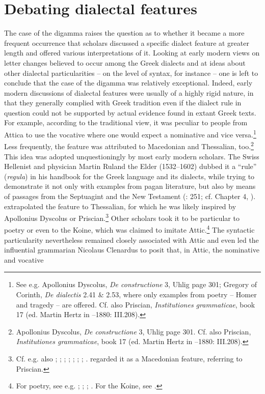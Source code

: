 \section{Debating dialectal features}\label{sec:6.4}

The case of the digamma raises the question as to whether it became a more frequent occurrence that scholars discussed a specific dialect feature at greater length and offered various interpretations of it. Looking at early modern views on letter changes believed to occur among the Greek dialects and at ideas about other dialectal particularities – on the level of syntax, for instance – one is left to conclude that the case of the digamma was relatively exceptional. Indeed, early modern discussions of dialectal features were usually of a highly rigid nature, in that they generally complied with Greek tradition even if the dialect rule in question could not be supported by actual evidence found in extant Greek texts. For example, according to the traditional view, it was peculiar to people from Attica to use the vocative where one would expect a nominative and vice versa.\footnote{See e.g. Apollonius Dyscolus, \textit{De constructione} 3, Uhlig page 301; Gregory of Corinth, \textit{De dialectis} 2.41 \& 2.53, where only examples from poetry – Homer and tragedy – are offered. Cf. also Priscian, \textit{Institutiones grammaticae}, book 17 (ed. Martin Hertz in \citealt{Keil1855}–1880: III.208).} Less frequently, the feature was attributed to Macedonian and Thessalian, too.\footnote{Apollonius Dyscolus, \textit{De constructione} 3, Uhlig page 301. Cf. also Priscian, \textit{Institutiones grammaticae}, book 17 (ed. Martin Hertz in \citealt{Keil1855}–1880: III.208).} This idea was adopted unquestioningly by most early modern scholars. The Swiss Hellenist and physician Martin Ruland the Elder (1532–1602) dubbed it a “rule” (\textit{regula}) in his handbook for the Greek language and its dialects, while trying to demonstrate it not only with examples from pagan literature, but also by means of passages from the Septuagint and the New Testament (\citealt{Ruland1556}: 251; cf. Chapter 4, ). \citet[302]{Ruland1556} extrapolated the feature to Thessalian, for which he was likely inspired by Apollonius Dyscolus or Priscian.\footnote{Cf. e.g. also \citet[36\textsc{\textsuperscript{r}}]{Da1509}; \citet[216]{Vergara1537}; \citet[50\textsc{\textsuperscript{v}}]{Nunez1555}; \citet[\textsc{x.1}\textsc{\textsuperscript{v}}]{Dabercusius1577}; \citet[5, second pagination sequence]{Rhenius1626}; \citet[8--9]{Pasor1632}; \citet[85-87]{Wyss1650}; \citet[88]{Leusden1670}. \citet[\textsc{b.3}\textsc{\textsuperscript{r}}]{Kirchmaier1709} regarded it as a Macedonian feature, referring to Priscian.} Other scholars took it to be particular to poetry or even to the Koine, which was claimed to imitate Attic.\footnote{For poetry, see e.g. \citet[\textsc{q.}i\textsc{\textsuperscript{v}}]{Amerot1520}; \citet[129]{Antesignanus1554}; \citet[34]{Gretser1593}; \citet[157]{Schmidt1604}. For the Koine, see \citet[54]{Lancelot1655}.} The syntactic particularity nevertheless remained closely associated with Attic and even led the influential grammarian Nicolaus Clenardus to posit that, in Attic, the nominative and vocative 